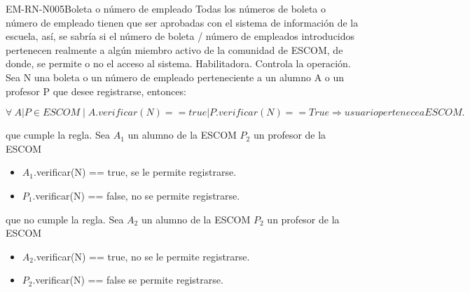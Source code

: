 \begin{BussinesRule}{EM-RN-N005}{Boleta o número de empleado}
	\BRitem[Descripción:]Todas los números de boleta o número de empleado tienen que ser aprobadas con el sistema de información de la escuela, así, se sabría si el número de boleta / número de empleados introducidos pertenecen realmente a algún miembro activo de la comunidad de ESCOM, de donde, se permite o no el acceso al sistema.
	\BRitem[Tipo:] Habilitadora.
	\BRitem[Nivel:] Controla la operación.
	\BRitem[Sentencia : ] Sea N una boleta o un número de empleado perteneciente a un alumno A o un profesor P que desee registrarse, entonces:
	\begin{center}
		$\forall \: A|P \in  ESCOM \mid A.verificar(N) == true | P.verificar(N) == True \Rightarrow usuario pertenece a ESCOM.$
	\end{center}
	
	 que cumple la regla.
		Sea $A_{1}$ un alumno de la ESCOM $P_{2}$ un profesor de la ESCOM
		\begin{itemize}
			\item $A_{1}$.verificar(N) == true, se le permite registrarse.
			\item $P_{1}$.verificar(N) == false, no se permite registrarse.
		\end{itemize}
	 que no cumple la regla.
		Sea $A_{2}$ un alumno de la ESCOM $P_{2}$ un profesor de la ESCOM
		\begin{itemize}
			\item $A_{2}$.verificar(N) == true, no se le permite registrarse.
			\item $P_{2}$.verificar(N) == false se permite registrarse.
		\end{itemize}
\end{BussinesRule}

